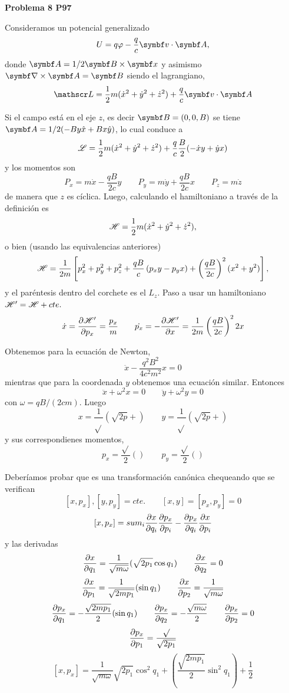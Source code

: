 \documentclass[10pt,oneside]{CBFT_book}
\begin{document}
\begin{ejemplo}{\bf Problema 8 P97}

Consideramos un potencial generalizado
\[
	U = q \vp - \frac q c \vb{v}\cdot\vb{A},
\]
donde $\vb{A} = 1/2 \pv{B}{x}$ y asimismo $\pv{\nabla}{A}=\vb{B}$ siendo el lagrangiano,
\[
	\Lag = \frac 1 2 m ( \dot{x}^2 + \dot{y}^2 + \dot{z}^2 ) + \frac{q}{c} \vb{v}\cdot\vb{A}
\]

Si el campo está en el eje $z$, es decir $\vb{B}=(0,0,B)$ se tiene $\vb{A} = 1 /2 ( -B y \hat{x} + B x \hat{y} )$, lo
cual conduce a 
\[
	\mathscr{L} = \frac 1 2 m ( \dot{x}^2 + \dot{y}^2 + \dot{z}^2 ) + \frac{q}{c} \frac{B}{2} ( - \dot{x} y + \dot{y} x )
\]
y los momentos son
\[
	P_x = m \dot{x} - \frac{qB}{2c}y \qquad
	P_y = m \dot{y} + \frac{qB}{2c}x \qquad 
	P_z = m \dot{z}  
\]
de manera que $z$ es cíclica. Luego, calculando el hamiltoniano a través de la definición es 
\[
	\mathscr{H} = \frac{1}{2} m ( \dot{x}^2 + \dot{y}^2 + \dot{z}^2 ),
\]
o bien (usando las equivalencias anteriores)
\[
	\mathscr{H} = \frac{1}{2m} \left[ p_x^2 + p_y^2 + p_z^2 + \frac{qB}{c}\left( p_x y - p_y x \right) +
	\left( \frac{ qB }{ 2c } \right)^2( x^2 + y^2 ) \right], 
\]
y el paréntesis dentro del corchete es el $L_z$.
Paso a usar un hamiltoniano $\mathscr{H}' = \mathscr{H} + cte.$
\[
	\dot{x} = \frac{\partial^{\hspace{-0.05em}} {\mathscr{H}'}}{\partial {p_x}^{\hspace{-0.05em}}} = \frac{p_x}{m} \qquad \dot{p_x} = -\frac{\partial^{\hspace{-0.05em}} {\mathscr{H}'}}{\partial {x}^{\hspace{-0.05em}}} = \frac{1}{2m}\left( \frac{ qB }{ 2c } \right)^2 2x
\]

Obtenemos para la ecuación de Newton,
\[
	\ddot{x} - \frac{q^2 B^2}{4 c^2 m^2} x = 0
\]
mientras que para la coordenada $y$ obtenemos una ecuación similar. Entonces
\[
	\ddot{x} + \omega^2 x = 0 \qquad \ddot{y} + \omega^2 y = 0
\]
con $\omega = q B / ( 2 c m )$. Luego
\[
	x = \frac{1}{\sqrt{ }}( \sqrt{ 2p } + ) \qquad y = \frac{1}{\sqrt{ }}( \sqrt{ 2p } + )
\]
y sus correspondienes momentos,
\[
	p_x = \frac{\sqrt{ }}{2} () \qquad p_y = \frac{\sqrt{ }}{2} ()
\]
 
Deberíamos probar que es una transformación canónica chequeando que se verifican
\[
	[ x, p_x ], [ y, p_y ] = cte. \qquad [ x, y ] = [ p_x, p_y ] = 0
\]
\[
	[ x, p_x ] = sum_i \frac{\partial^{\hspace{-0.05em}} {x}}{\partial {q_i}^{\hspace{-0.05em}}} \frac{\partial^{\hspace{-0.05em}} {p_x}}{\partial {p_i}^{\hspace{-0.05em}}} - \frac{\partial^{\hspace{-0.05em}} {p_x}}{\partial {q_i}^{\hspace{-0.05em}}} \frac{\partial^{\hspace{-0.05em}} {x}}{\partial {p_i}^{\hspace{-0.05em}}}
\]
y las derivadas
\[
	\frac{\partial^{\hspace{-0.05em}} {x}}{\partial {q_1}^{\hspace{-0.05em}}} = \frac{1}{\sqrt{m\omega}} ( \sqrt{ 2p_1} \cos q_1 ) \qquad \frac{\partial^{\hspace{-0.05em}} {x}}{\partial {q_2}^{\hspace{-0.05em}}} = 0
\]
\[
	\frac{\partial^{\hspace{-0.05em}} {x}}{\partial {p_1}^{\hspace{-0.05em}}} = \frac{1}{\sqrt{2 m p_1}} ( \sin q_1 ) \qquad \frac{\partial^{\hspace{-0.05em}} {x}}{\partial {p_2}^{\hspace{-0.05em}}} = \frac{1}{\sqrt{m\omega}}
\]
\[
	\frac{\partial^{\hspace{-0.05em}} {p_x}}{\partial {q_1}^{\hspace{-0.05em}}} = -\frac{\sqrt{2 m p_1}}{2} ( \sin q_1 ) \qquad \frac{\partial^{\hspace{-0.05em}} {p_x}}{\partial {q_2}^{\hspace{-0.05em}}} = -\frac{\sqrt{m \omega}}{2} \qquad \frac{\partial^{\hspace{-0.05em}} {p_x}}{\partial {p_2}^{\hspace{-0.05em}}} = 0
\] 
\[
	\frac{\partial^{\hspace{-0.05em}} {p_x}}{\partial {p_1}^{\hspace{-0.05em}}} = \frac{\sqrt{ }}{\sqrt{2p_1}}
\]
\[
	[ x, p_x ] = \frac{1}{ \sqrt{ m \omega} } \sqrt{ 2 p_1 } \cos^2 q_1 + \left( \frac{\sqrt{2 m p_1}}{2} \sin^2 q_1 \right) + \frac{1}{2}
\]


\end{ejemplo}
\end{document}
